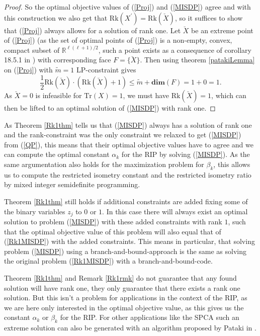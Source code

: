 \documentclass[a4paper,11pt,1p]{elsarticle}
\newcommand{\Tr}{\text{Tr}}
\newcommand{\Rk}{\text{Rk}}
\newcommand{\R}{\mathds{R}}
\begin{document}
\begin{proof}
So the optimal objective values of (\ref{Proj}) and (\ref{MISDP}) agree and with this construction we also get that 
$\Rk(X^{\prime}) = \Rk(\check{X})$, so it suffices to show that (\ref{Proj}) always allows for a solution of rank one.
Let $\breve{X}$ be an extreme point of (\ref{Proj}) (as the set of optimal points of (\ref{Proj}) is a non-empty, convex, compact subset of $\R^{\ell(\ell+1)/2}$, such a point exists as a consequence of corollary 18.5.1 in
\cite{Roc70}) with corresponding face $F=\{\breve{X}\}$. Then using theorem \ref{patakiLemma} on (\ref{Proj}) with $\tilde{m} = 1$ LP-constraint gives
\begin{equation*}
 \frac{1}{2}\Rk(\breve{X})\cdot(\Rk(\breve{X})+1) \leq \tilde{m} + \textbf{dim}(F) = 1 + 0 = 1.
\end{equation*}
As $\breve{X}=0$ is infeasible for $\Tr(X)=1$, we must have $\Rk(\breve{X}) = 1$, which can then be lifted to an optimal solution of (\ref{MISDP}) with rank one.
\end{proof}

As Theorem \ref{Rk1thm} tells us that (\ref{MISDP}) always has a solution of rank one and the rank-constraint was the only constraint we relaxed to get (\ref{MISDP}) from (\ref{QP}), this means that their optimal objective values 
have to agree and we can compute the optimal constant $\alpha_k$ for the RIP by solving (\ref{MISDP}). As the same argumentation also holds for the maximization problem for $\beta_k$, this allows us to compute the restricted isometry
constant and the restricted isometry ratio by mixed integer semidefinite programming.



\begin{rmk}\label{Rk1rmk}
Theorem \ref{Rk1thm} still holds if additional constraints are added fixing some of the binary variables $z_j$ to $0$ or $1$. In this case there will always exist an optimal solution to problem (\ref{MISDP}) with these added
constraints with rank $1$, such that the optimal objective value of this problem will also equal that of (\ref{Rk1MISDP}) with the added constraints. This means in particular, that solving problem (\ref{MISDP}) using a 
branch-and-bound-approach is the same as solving the original problem (\ref{Rk1MISDP}) with a branch-and-bound-code.
\end{rmk}

Theorem \ref{Rk1thm} and Remark \ref{Rk1rmk} do not guarantee that any found solution will have rank one, they only guarantee that there exists a rank one solution. But this isn't a problem for applications in the context of the RIP, 
as we are here only interested in the optimal objective value, as this gives us the constant $\alpha_k$ or $\beta_k$ for the RIP. For other applications like the SPCA such an extreme solution can also be generated with an algorithm 
proposed by Pataki in \cite{coneLP}.
\end{document}
